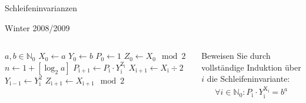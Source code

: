 \begin{frame}{Schleifeninvarianzen}
    \begin{exampleblock}{Winter 2008/2009}
        \begin{columns}
                \begin{algorithm}
                    \begin{algorithmic}
                        \Require $a, b \in \mathbb{N}_0$
                        \State $X_0 \gets a$
                        \State $Y_0 \gets b$
                        \State $P_0 \gets 1$
                        \State $Z_0 \gets X_0 \mod 2$
                        \State $n \gets 1 + \left[ \log_2 a\right]$
                            \State $P_\mathrm{i+1} \gets P_\mathrm{i}\cdot Y_\mathrm{i}^\mathrm{Z_\mathrm{i}}$
                            \State $X_\mathrm{i+1} \gets X_\mathrm{i} \div 2$
                            \State $Y_\mathrm{i-1} \gets Y_\mathrm{i}^2$
                            \State $Z_\mathrm{i+1} \gets X_\mathrm{i+1} \mod 2$
                        \EndFor
                    \end{algorithmic}
                \end{algorithm}
                Beweisen Sie durch vollständige Induktion über $i$ die Schleifeninvariante:
                \begin{align*}
                    \forall i \in \mathbb{N}_0: P_\mathrm{i} \cdot Y_\mathrm{i}^\mathrm{X_\mathrm{i}} = b^a
            \end{align*}
        \end{columns}
    \end{exampleblock}
\end{frame}


